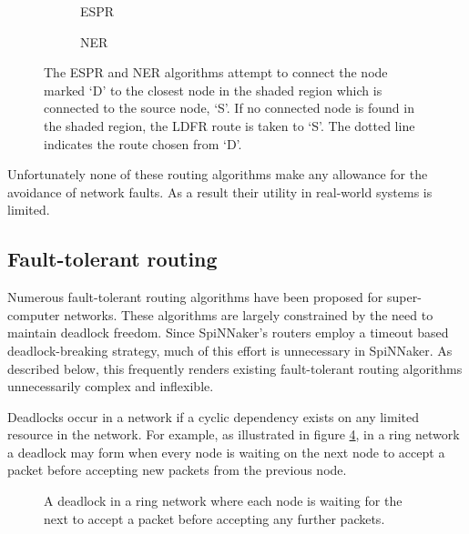 			\begin{figure}
				\center
				\begin{subfigure}{0.45\linewidth}
					\center
					
					\caption{ESPR}
					\label{fig:search-regions-espr}
				\end{subfigure}
				\begin{subfigure}{0.45\linewidth}
					\center
					
					\caption{NER}
					\label{fig:search-regions-espr}
				\end{subfigure}
				
				\caption{The ESPR and NER algorithms attempt to connect the node marked
				`D' to the closest node in the shaded region which is connected to the
				source node, `S'. If no connected node is found in the shaded region, the
				LDFR route is taken to `S'. The dotted line indicates the route chosen
				from `D'.}
				\label{fig:search-regions}
			\end{figure}
			
			Unfortunately none of these routing algorithms make any allowance for the
			avoidance of network faults. As a result their utility in real-world
			systems is limited.
		
		\subsection{Fault-tolerant routing}
			
			Numerous fault-tolerant routing algorithms have been proposed for
			super-computer networks. These algorithms are largely constrained by the
			need to maintain deadlock freedom. Since SpiNNaker's routers employ a
			timeout based deadlock-breaking strategy, much of this effort is
			unnecessary in SpiNNaker. As described below, this frequently renders
			existing fault-tolerant routing algorithms unnecessarily complex and
			inflexible.
			
			Deadlocks occur in a network if a cyclic dependency exists on any limited
			resource in the network. For example, as illustrated in figure
			\ref{fig:ring-deadlock}, in a ring network a deadlock may form when every
			node is waiting on the next node to accept a packet before accepting new
			packets from the previous node.
			
			\begin{figure}
				\center
				
				\caption{A deadlock in a ring network where each node is waiting for
				the next to accept a packet before accepting any further packets.}
				\label{fig:ring-deadlock}
			\end{figure}
			

